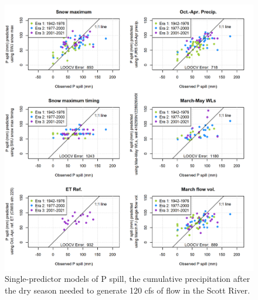 \documentclass[hess, manuscript]{copernicus}
\begin{document}
\begin{figure}
\includegraphics[width=1\linewidth]{f14} \caption{\label{fig:one_predictor_model_p_spill} Single-predictor models of P spill, the cumulative precipitation after the dry season needed to generate 120 cfs of flow in the Scott River.}\label{fig:one_predictor_model_p_spill}
\end{figure}
\end{document}
